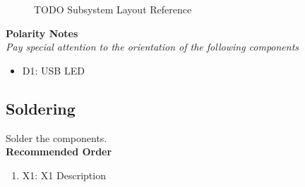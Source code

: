 \documentclass{article}
\begin{document}
\begin{figure}[H]
    \centering
        \qquad
        \caption{TODO Subsystem Layout Reference}%
    \label{fig:TODO-layout}%
\end{figure}

\noindent \textbf{Polarity Notes}\\
\noindent \textit{Pay special attention to the orientation of the following components}
\begin{itemize}
  \item D1: USB LED
\end{itemize}

\subsection{Soldering}

Solder the components. \\

\noindent \textbf{Recommended Order}

\begin{enumerate}
  \item X1: X1 Description
\end{enumerate}
\end{document}
